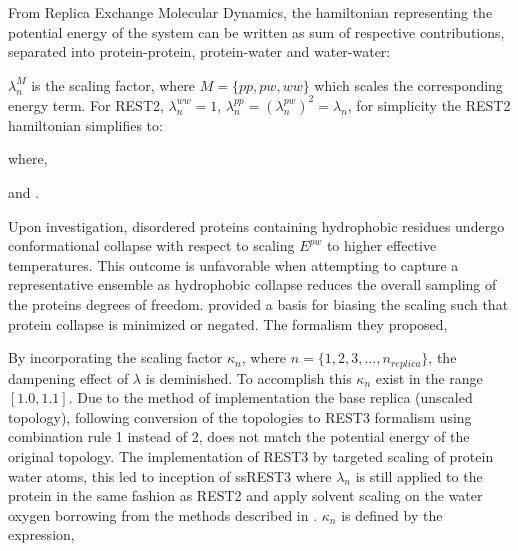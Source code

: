 From Replica Exchange Molecular Dynamics\cite{Sugita1999}, the hamiltonian representing the potential energy of the system can be written as sum of respective contributions, separated into protein-protein, protein-water and water-water:

$\lambda_{n}^M$ is the scaling factor, where $M=\{ pp, pw, ww\}
$ which scales the corresponding energy term. For REST2\cite{Wang2011}, $\lambda_n^{ww}=1$, $\lambda_n^{pp}=(\lambda_n^{pw})^2=\lambda_n$, for simplicity the REST2 hamiltonian simplifies to:

where,

and . 

Upon investigation, disordered proteins containing hydrophobic residues undergo conformational collapse with respect to scaling  $E^{pw}$ to higher effective temperatures. This outcome is unfavorable when attempting to capture a representative ensemble as hydrophobic collapse reduces the overall sampling of the proteins degrees of freedom. %
\citeauthor{Zhang2023} \citeyear{Zhang2023} provided a basis for biasing the scaling such that protein collapse is minimized or negated. The formalism they proposed,

By incorporating the scaling factor $\kappa_n$, where $n=\{1,2,3,\ldots,n_{replica}\}$, the dampening effect of $\lambda$ is deminished. To accomplish this $\kappa_n$ exist in the range $[1.0,1.1]$. Due to the method of implementation the base replica (unscaled topology), following conversion of the topologies to REST3 \cite{Zhang2023} formalism using combination rule 1 instead of 2, does not match the potential energy of the original topology. The implementation of REST3 by \citeauthor{Zhang2023} targeted scaling of protein water atoms, this led to inception of ssREST3 where $\lambda_n$ is still applied to the protein in the same fashion as REST2 \cite{Wang2011} and apply solvent scaling on the water oxygen borrowing from the methods described in \citeauthor{Best2010} \citeyear{Best2010}. $\kappa_n$ is defined by the expression, 








